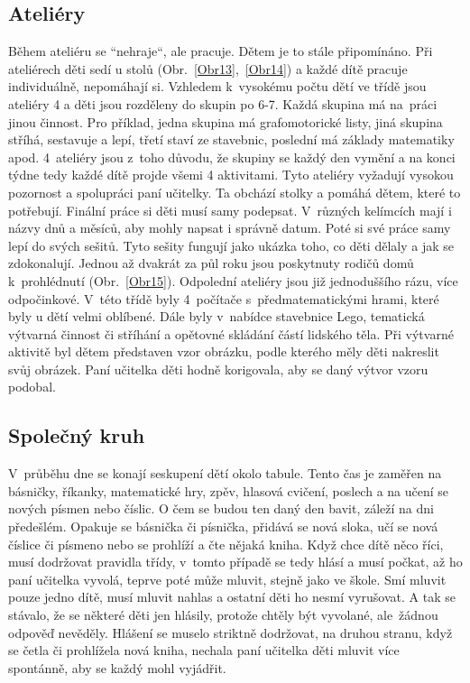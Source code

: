 		\subsection{Ateliéry}
		\label{ateliery}
			Během ateliéru se “nehraje“, ale pracuje. Dětem je to stále připomínáno. Při ateliérech děti sedí u stolů (Obr.~\ref{Obr13},~\ref{Obr14}) a každé dítě pracuje individuálně, nepomáhají si. Vzhledem k vysokému počtu dětí ve třídě jsou ateliéry 4 a děti jsou rozděleny do skupin po 6-7. Každá skupina má na práci jinou činnost. Pro příklad, jedna skupina má grafomotorické listy, jiná skupina stříhá, sestavuje a lepí, třetí staví ze stavebnic, poslední má základy matematiky apod. 4 ateliéry jsou z toho důvodu, že skupiny se každý den vymění a na konci týdne tedy každé dítě projde všemi 4 aktivitami. Tyto ateliéry vyžadují vysokou pozornost a spolupráci paní učitelky. Ta obchází stolky a pomáhá dětem, které to potřebují. 
			Finální práce si děti musí samy podepsat. V různých kelímcích mají i názvy dnů a měsíců, aby mohly napsat i správně datum. Poté si své práce samy lepí do svých sešitů. Tyto sešity fungují jako ukázka toho, co děti dělaly a jak se zdokonalují. Jednou až dvakrát za půl roku jsou poskytnuty rodičů domů k prohlédnutí (Obr.~\ref{Obr15}). 
			Odpolední ateliéry jsou již jednoduššího rázu, více odpočinkové. V této třídě byly 4 počítače s předmatematickými hrami, které byly u dětí velmi oblíbené. Dále byly v nabídce stavebnice Lego, tematická výtvarná činnost či stříhání a opětovné skládání částí lidského těla. Při výtvarné aktivitě byl dětem představen vzor obrázku, podle kterého měly děti nakreslit svůj obrázek. Paní učitelka děti hodně korigovala, aby se daný výtvor vzoru podobal.

		\subsection{Společný kruh}
			V průběhu dne se konají seskupení dětí okolo tabule. Tento čas je zaměřen na básničky, říkanky, matematické hry, zpěv, hlasová cvičení, poslech a na učení se nových písmen nebo číslic. O čem se budou ten daný den bavit, záleží na dni předešlém. Opakuje se básnička či písnička, přidává se nová sloka, učí se nová číslice či písmeno nebo se prohlíží a čte nějaká kniha. Když chce dítě něco říci, musí dodržovat pravidla třídy, v tomto případě se tedy hlásí a musí počkat, až ho paní učitelka vyvolá, teprve poté může mluvit, stejně jako ve škole. Smí mluvit pouze jedno dítě, musí mluvit nahlas a ostatní děti ho nesmí vyrušovat. A tak se stávalo, že se některé děti jen hlásily, protože chtěly být vyvolané, ale žádnou odpověď nevěděly. Hlášení se muselo striktně dodržovat, na druhou stranu, když se četla či prohlížela nová kniha, nechala paní učitelka děti mluvit více spontánně, aby se každý mohl vyjádřit.

